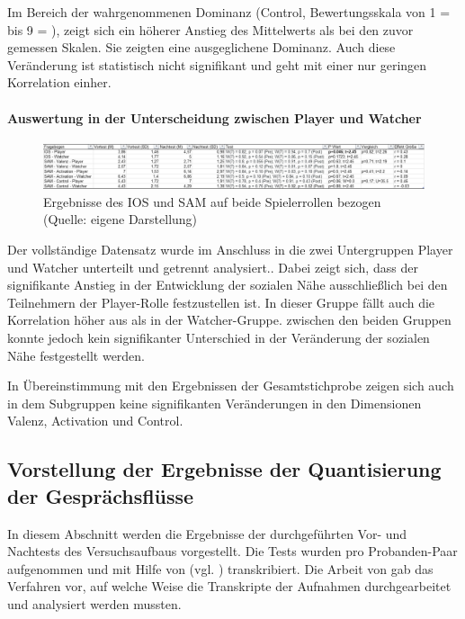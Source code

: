 Im Bereich der wahrgenommenen Dominanz (Control, Bewertungsskala von 1 =  bis 9 = ), zeigt sich ein höherer Anstieg des Mittelwerts als bei den zuvor gemessen Skalen. Sie zeigten eine ausgeglichene Dominanz. Auch diese Veränderung ist statistisch nicht signifikant und geht mit einer nur geringen Korrelation einher.

\paragraph{Auswertung in der Unterscheidung zwischen Player und Watcher}

\begin{figure}[ht]
\centering
\includegraphics[width=1\linewidth]{content/pictures/IOS_SAM_Player_Watcher.png}
\caption{Ergebnisse des \ac{IOS} und \ac{SAM} auf beide Spielerrollen bezogen (Quelle: eigene Darstellung)}
\label{fig:ios_sam_roles}
\end{figure}

Der vollständige Datensatz wurde im Anschluss in die zwei Untergruppen Player und Watcher unterteilt und getrennt analysiert.. Dabei zeigt sich, dass der signifikante Anstieg in der Entwicklung der sozialen Nähe ausschließlich bei den Teilnehmern der Player-Rolle festzustellen ist. In dieser Gruppe fällt auch die Korrelation höher aus als in der Watcher-Gruppe. zwischen den beiden Gruppen konnte jedoch kein signifikanter Unterschied in der Veränderung der sozialen Nähe festgestellt werden.

In Übereinstimmung mit den Ergebnissen der Gesamtstichprobe zeigen sich auch in dem Subgruppen keine signifikanten Veränderungen in den Dimensionen Valenz, Activation und Control.

\subsection{Vorstellung der Ergebnisse der Quantisierung der Gesprächsflüsse}
In diesem Abschnitt werden die Ergebnisse der durchgeführten Vor- und Nachtests des Versuchsaufbaus vorgestellt. Die Tests wurden pro Probanden-Paar aufgenommen und mit Hilfe von  (vgl. \cite{bain_whisperx_2023}) transkribiert. Die Arbeit von \cite{nasir_effect_2015} gab das Verfahren vor, auf welche Weise die Transkripte der Aufnahmen durchgearbeitet und analysiert werden mussten.

